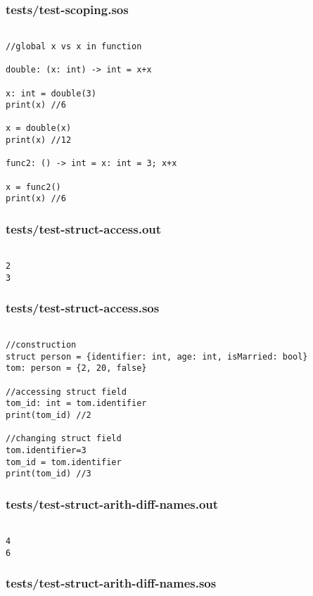 \documentclass[main.tex]{subfiles}
\begin{document}
\subsubsection{tests/test-scoping.sos}

\begin{lstlisting}

//global x vs x in function

double: (x: int) -> int = x+x

x: int = double(3)
print(x) //6

x = double(x)
print(x) //12

func2: () -> int = x: int = 3; x+x

x = func2()
print(x) //6
\end{lstlisting}

\subsubsection{tests/test-struct-access.out}

\begin{lstlisting}

2
3
\end{lstlisting}

\subsubsection{tests/test-struct-access.sos}

\begin{lstlisting}

//construction
struct person = {identifier: int, age: int, isMarried: bool}
tom: person = {2, 20, false}

//accessing struct field
tom_id: int = tom.identifier
print(tom_id) //2

//changing struct field
tom.identifier=3
tom_id = tom.identifier
print(tom_id) //3

\end{lstlisting}

\subsubsection{tests/test-struct-arith-diff-names.out}

\begin{lstlisting}

4
6
\end{lstlisting}

\subsubsection{tests/test-struct-arith-diff-names.sos}
\end{document}

